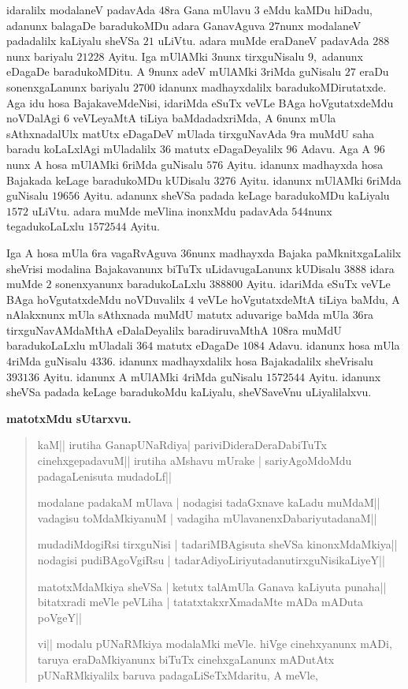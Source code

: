idaralilx modalaneV padavAda $48$ra Gana mUlavu $3$ eMdu kaMDu hiDadu, adanunx balagaDe baradukoMDu adara GanavAguva $27$nunx modalaneV padadalilx kaLiyalu sheVSa $21$ uLiVtu. adara muMde eraDaneV padavAda $288$nunx bariyalu $21228$ Ayitu. Iga mUlAMki $3$nunx tirxguNisalu $9,$ adanunx eDagaDe baradukoMDitu. A $9$nunx adeV mUlAMki $3$riMda guNisalu $27$ eraDu sonenxgaLanunx bariyalu $2700$ idanunx madhayxdalilx baradukoMDirutatxde. Aga idu hosa BajakaveMdeNisi, idariMda eSuTx veVLe BAga hoVgutatxdeMdu noVDalAgi $6$ veVLeyaMtA tiLiya baMdadadxriMda, A $6$nunx mUla sAthxnadalUlx matUtx eDagaDeV mUlada tirxguNavAda $9$ra muMdU saha baradu koLaLxlAgi mUladalilx $36$ matutx eDagaDeyalilx $96$ Adavu. Aga A $96$nunx A hosa mUlAMki $6$riMda guNisalu $576$ Ayitu. idanunx madhayxda hosa Bajakada keLage baradukoMDu kUDisalu $3276$ Ayitu. idanunx mUlAMki $6$riMda guNisalu $19656$ Ayitu. adanunx sheVSa padada keLage baradukoMDu kaLiyalu $1572$ uLiVtu. adara muMde meVlina inonxMdu padavAda $544$nunx tegadukoLaLxlu $1572544$ Ayitu.

Iga A hosa mUla $6$ra vagaRvAguva $36$nunx madhayxda Bajaka paMknitxgaLalilx sheVrisi modalina Bajakavanunx biTuTx uLidavugaLanunx kUDisalu $3888$ idara muMde $2$ sonenxyanunx baradukoLaLxlu $388800$ Ayitu. idariMda \hbox{eSuTx} veVLe BAga hoVgutatxdeMdu noVDuvalilx $4$ veVLe hoVgutatxdeMtA tiLiya baMdu, A nAlakxnunx mUla sAthxnada muMdU matutx aduvarige baMda mUla $36$ra tirxguNavAMdaMthA eDalaDeyalilx baradiruvaMthA $108$ra muMdU baradukoLaLxlu mUladali $364$ matutx eDagaDe $1084$ Adavu. idanunx hosa mUla $4$riMda guNisalu $4336.$ idanunx madhayxdalilx hosa Bajakadalilx sheVrisalu $393136$ Ayitu. idanunx A mUlAMki $4$riMda guNisalu $1572544$ Ayitu. idanunx sheVSa padada keLage baradukoMdu kaLiyalu, sheVSaveVnu uLiyalilalxvu.

\begin{center}
{\bf matotxMdu sUtarxvu.}
\end{center}

\begin{verse}
kaM|| irutiha GanapUNaRdiya| pariviDideraDeraDabiTuTx cinehxgepadavuM|| irutiha aMshavu mUrake | sariyAgoMdoMdu padagaLenisuta mudadoLf||

modalane padakaM mUlava | nodagisi tadaGxnave kaLadu muMdaM||
vadagisu toMdaMkiyanuM | vadagiha mUlavanenxDabariyutadanaM||

mudadiMdogiRsi tirxguNisi | tadariMBAgisuta sheVSa kinonxMdaMkiya|| nodagisi pudiBAgoVgiRsu | tadarAdiyoLiriyutadanutirxguNisikaLiyeY||

matotxMdaMkiya sheVSa | ketutx talAmUla Ganava kaLiyuta punaha|| bitatxradi meVle peVLiha | tatatxtakxrXmadaMte mADa mADuta poVgeY||

vi|| modalu pUNaRMkiya modalaMki meVle. hiVge cinehxyanunx mADi, taruya eraDaMkiyanunx biTuTx cinehxgaLanunx mADutAtx pUNaRMkiyalilx baruva padagaLiSeTxMdaritu, A meVle,
\end{verse}

